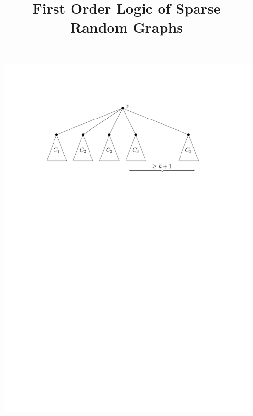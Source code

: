 \documentclass[handout, 11pt]{beamer}
\title[First Order Logic of Sparse Random Graphs]{First Order
Logic of Sparse Random Graphs}
\begin{document}
	\frame{\titlepage}
\begin{frame}
	\includegraphics[scale=0.5]{kmorphictrees}
\end{frame}
\end{document}
